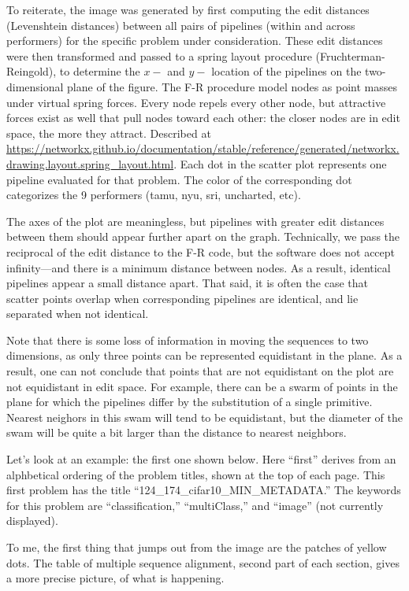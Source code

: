 \documentclass{article}
\begin{document}
To reiterate, the image was generated by first computing the edit
distances (Levenshtein distances) between all pairs of pipelines
(within and across performers) for the specific problem under
consideration.  These edit distances were then transformed and passed
to a spring layout procedure (Fruchterman-Reingold), to determine the
$x-$ and $y-$ location of the pipelines on the two-dimensional plane
of the figure.  The F-R procedure model nodes as point masses under
virtual spring forces.  Every node repels every other node, but
attractive forces exist as well that pull nodes toward each other: the
closer nodes are in edit space, the more they attract.  Described at
\url{https://networkx.github.io/documentation/stable/reference/generated/networkx.drawing.layout.spring_layout.html}{}.
Each dot in the scatter plot represents one pipeline evaluated for
that problem.  The color of the corresponding dot categorizes the 9
performers (tamu, nyu, sri, uncharted, etc).


The axes of the plot are meaningless, but pipelines with greater edit
distances between them should appear further apart on the graph.
Technically, we pass the reciprocal of the edit distance to the F-R
code, but the software does not accept infinity---and there is a
minimum distance between nodes.  As a result, identical pipelines
appear a small distance apart.  That said, it is often the case that
scatter points overlap when corresponding pipelines are identical, and
lie separated when not identical.

Note that there is some loss of information in moving the sequences to
two dimensions, as only three points can be represented equidistant in
the plane.  As a result, one can not conclude that points that are not
equidistant on the plot are not equidistant in edit space.  For
example, there can be a swarm of points in the plane for which the
pipelines differ by the substitution of a single primitive.  Nearest
neighors in this swam will tend to be equidistant, but the diameter of
the swam will be quite a bit larger than the distance to nearest
neighbors.

Let's look at an example: the first one shown below.  Here ``first''
derives from an alphbetical ordering of the problem titles, shown at
the top of each page.  This first problem has the title
``124\_174\_cifar10\_MIN\_METADATA.''  The keywords for this problem
are ``classification,'' ``multiClass,'' and ``image'' (not currently
displayed).

To me, the first thing that jumps out from the image are the patches
of yellow dots.  The table of multiple sequence alignment, second part
of each section, gives a more precise picture, of what is happening.
\end{document}
